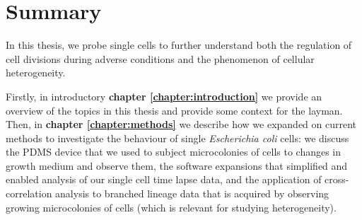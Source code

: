 

\chapter*{Summary}


In this thesis, we probe single cells to 
further understand both
the regulation of cell divisions during adverse conditions
and the phenomenon of cellular heterogeneity.

Firstly, in introductory \textbf{chapter \ref{chapter:introduction}} we 
provide an overview of the topics in this thesis and provide some context for the layman.
%
Then, in \textbf{chapter \ref{chapter:methods}} we describe how we expanded on current methods to investigate the behaviour of single \textit{Escherichia coli} cells: 
%
we discuss the PDMS device that we used to subject microcolonies of cells to changes in growth medium and observe them,
the software expansions that simplified and enabled analysis of our single cell time lapse data, and 
the application of cross-correlation analysis to branched lineage data that is acquired by observing growing microcolonies of cells (which is relevant for studying heterogeneity).

